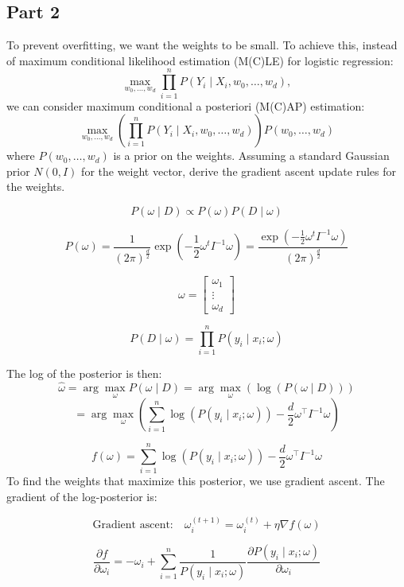 \subsection{Part 2}
To prevent overfitting, we want the weights to be small. To achieve this, instead of maximum conditional likelihood estimation (M(C)LE) for logistic regression:
\[
\max_{w_{0},\ldots,w_{d}} \prod_{i=1}^n P(Y_i \mid X_i, w_0, \ldots, w_d),
\]
we can consider maximum conditional a posteriori (M(C)AP) estimation:
\[
\max_{w_{0},\ldots,w_{d}} \left( \prod_{i=1}^n P(Y_i \mid X_i, w_0, \ldots, w_d) \right) P(w_0, \ldots, w_d)
\]
where $P(w_0, \ldots, w_d)$ is a prior on the weights. Assuming a standard Gaussian prior $N(0, I)$ for the weight vector, derive the gradient ascent update rules for the weights.
\begin{qsolve}
	\begin{qsolve}[]
		
		\[
		P(\omega \mid D) \propto P(\omega) P(D \mid \omega)
		\]

		\[
		P(\omega) = \frac{1}{(2\pi)^{\frac{d}{2}}} \exp\left(-\frac{1}{2} \omega^t I^{-1} \omega\right) = \frac{\exp(-\frac{1}{2} \omega^t I^{-1} \omega)}{(2\pi)^{\frac{d}{2}}}
		\]

		\[
		\omega = \begin{bmatrix} \omega_1 \\ \vdots \\ \omega_d \end{bmatrix}
		\]

		\[
		P(D \mid \omega) = \prod_{i=1}^n P(y_i \mid x_i; \omega)
		\]

		The log of the posterior is then:
		$$
		\hat{\omega} = \arg\max_{\omega} P(\omega \mid D) = \arg\max_{\omega} \left(\log(P(\omega \mid D))\right)
		$$
		$$
		 = \arg\max_{\omega} \left(\sum_{i=1}^n \log(P(y_i \mid x_i; \omega)) - \frac{d}{2} \omega^\top I^{-1} \omega \right)
		$$
		
		$$
		f(\omega) = \sum_{i=1}^n \log(P(y_i \mid x_i; \omega)) - \frac{d}{2} \omega^\top I^{-1} \omega
		$$
		To find the weights that maximize this posterior, we use gradient ascent. The gradient of the log-posterior is:
		
		$$
		\text{Gradient ascent:} \quad \omega_{i}^{(t+1)} = \omega_{i}^{(t)} + \eta \nabla f(\omega)
		$$
		
		\[
		\frac{\partial f}{\partial \omega_i} = -\omega_i + \sum_{i=1}^n \frac{1}{P(y_i \mid x_i; \omega)} \frac{\partial P(y_i \mid x_i; \omega)}{\partial \omega_i}
		\]


\end{qsolve}
\end{qsolve}
